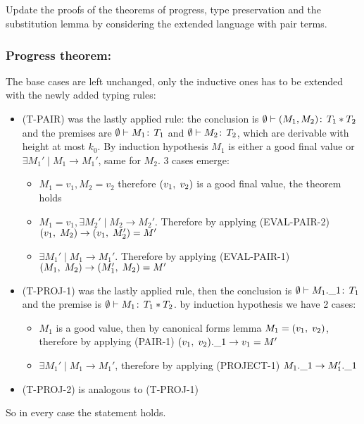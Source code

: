 \subsection{}
Update the proofs of the theorems of progress, type preservation and the substitution lemma by
considering the extended language with pair terms.

\subsubsection*{Progress theorem:}

The base cases are left unchanged, only the inductive ones has to be extended with the newly
added typing rules:
\begin{itemize}
\item (T-PAIR) was the lastly applied rule: the conclusion is
  \(\emptyset \vdash (M_1, M_2) \!:\,T_1 * T_2\) and the premises
  are \(\emptyset \vdash M_1 \!:\,T_1\) and \(\emptyset \vdash M_2
  \!:\,T_2\), which are derivable with height at most \(k_0\). By
  induction hypothesis \(M_1\) is either a good final value or
  \(\exists M_1' \mid M_1 \to M_1'\), same for \(M_2\). 3 cases
  emerge:
  \begin{itemize}
    \item \(M_1 = v_1, M_2 = v_2\) therefore \((v_1,\;v_2)\) is a
      good final value, the theorem holds
    \item \(M_1 = v_1, \exists M_2'\mid M_2 \to M_2'\). Therefore by
      applying (EVAL-PAIR-2) \((v_1,\;M_2) \to (v_1,\;M_2') =
      M'\)
    \item \(\exists M_1'\mid M_1 \to M_1'\). Therefore by applying
      (EVAL-PAIR-1) \((M_1,\;M_2) \to (M_1',\;M_2) = M'\)
  \end{itemize}
\item (T-PROJ-1) was the lastly applied rule, then the conclusion is
  \(\emptyset \vdash M_1.\_1 \!:\,T_1\) and the premise is
  \(\emptyset \vdash M_1 \!:\,T_1 * T_2\). by induction hypothesis
  we have 2 cases:
  \begin{itemize}
  \item \(M_1\) is a good value, then by canonical forms lemma \(M_1 =
    (v_1,\;v_2)\), therefore by applying (PAIR-1)
    \((v_1,\;v_2).\_1 \to v_1 = M'\)
  \item \(\exists M_1' \mid M_1 \to M_1'\), therefore by applying
    (PROJECT-1) \(M_1.\_1 \to M_1'.\_1\)
  \end{itemize}
\item (T-PROJ-2) is analogous to (T-PROJ-1)
\end{itemize}
So in every case the statement holds.

